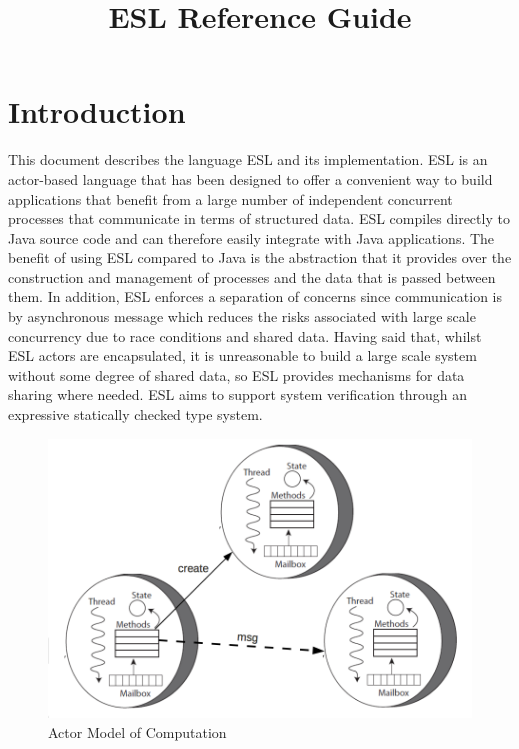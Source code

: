 \documentclass[5p,times]{elsarticle}
\title{ESL Reference Guide}
\begin{document}
\maketitle

\tableofcontents

\section{Introduction}

\label{sec:introduction}

This document describes the language ESL and its implementation. ESL is an actor-based language that has been designed to offer a convenient way to build applications that benefit from a large number of independent concurrent processes that communicate in terms of structured data. ESL compiles directly to Java source code and can therefore easily integrate with Java applications. The benefit of using ESL compared to Java is the abstraction that it provides over the construction and management of processes and the data that is passed between them. In addition, ESL enforces a separation of concerns since communication is by asynchronous message which reduces the risks associated with large scale concurrency due to race conditions and shared data. Having said that, whilst ESL actors are encapsulated, it is unreasonable to build a large scale system without some degree of shared data, so ESL provides mechanisms for data sharing where needed. ESL aims to support system verification through an expressive statically checked type system.

\begin{figure}
\centering
\includegraphics[width=\columnwidth]{actors}
\vspace{-0.20cm}
\caption{Actor Model of Computation \cite{karmani2009actor}}
\label{fig:actors}
\end{figure}
\end{document}
